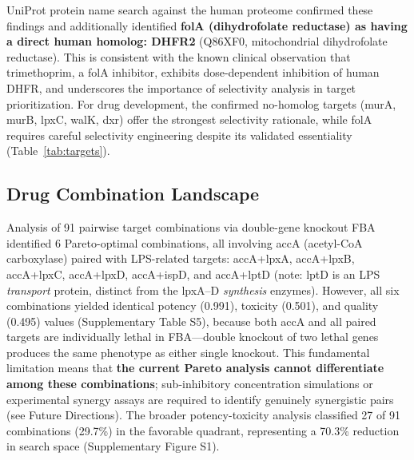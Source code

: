 \documentclass[12pt,a4paper]{article}
\begin{document}
UniProt protein name search against the human proteome confirmed these findings and additionally identified \textbf{folA (dihydrofolate reductase) as having a direct human homolog: DHFR2} (Q86XF0, mitochondrial dihydrofolate reductase). This is consistent with the known clinical observation that trimethoprim, a folA inhibitor, exhibits dose-dependent inhibition of human DHFR, and underscores the importance of selectivity analysis in target prioritization. For drug development, the confirmed no-homolog targets (murA, murB, lpxC, walK, dxr) offer the strongest selectivity rationale, while folA requires careful selectivity engineering despite its validated essentiality (Table~\ref{tab:targets}).

\subsection{Drug Combination Landscape}
Analysis of 91 pairwise target combinations via double-gene knockout FBA identified 6 Pareto-optimal combinations, all involving accA (acetyl-CoA carboxylase) paired with LPS-related targets: accA+lpxA, accA+lpxB, accA+lpxC, accA+lpxD, accA+ispD, and accA+lptD (note: lptD is an LPS \textit{transport} protein, distinct from the lpxA--D \textit{synthesis} enzymes). However, all six combinations yielded identical potency (0.991), toxicity (0.501), and quality (0.495) values (Supplementary Table S5), because both accA and all paired targets are individually lethal in FBA---double knockout of two lethal genes produces the same phenotype as either single knockout. This fundamental limitation means that \textbf{the current Pareto analysis cannot differentiate among these combinations}; sub-inhibitory concentration simulations or experimental synergy assays are required to identify genuinely synergistic pairs (see Future Directions). The broader potency-toxicity analysis classified 27 of 91 combinations (29.7\%) in the favorable quadrant, representing a 70.3\% reduction in search space (Supplementary Figure S1).
\end{document}
